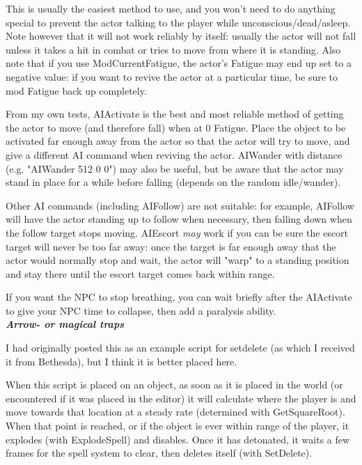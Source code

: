 This is usually the easiest method to use, and you won't need to do
anything special to prevent the actor talking to the player while
unconscious/dead/asleep. Note however that it will not work reliably by
itself: usually the actor will not fall unless it takes a hit in combat
or tries to move from where it is standing. Also note that if you use
ModCurrentFatigue, the actor's Fatigue may end up set to a negative
value: if you want to revive the actor at a particular time, be sure to
mod Fatigue back up completely.

From my own tests, AIActivate is the best and most reliable method of
getting the actor to move (and therefore fall) when at 0 Fatigue. Place
the object to be activated far enough away from the actor so that the
actor will try to move, and give a different AI command when reviving
the actor. AIWander with distance (e.g. "AIWander 512 0 0") may also be
useful, but be aware that the actor may stand in place for a while
before falling (depends on the random idle/wander).

Other AI commands (including AIFollow) are not suitable: for example,
AIFollow will have the actor standing up to follow when necessary, then
falling down when the follow target stops moving. AIEscort \emph{may}
work if you can be sure the escort target will never be too far away:
once the target is far enough away that the actor would normally stop
and wait, the actor will "warp" to a standing position and stay there
until the escort target comes back within range.

If you want the NPC to stop breathing, you can wait briefly after the
AIActivate to give your NPC time to collapse, then add a paralysis
ability.\\
\emph{\textbf{Arrow- or magical traps}}

I had originally posted this as an example script for setdelete (as
which I received it from Bethesda), but I think it is better placed
here.

When this script is placed on an object, as soon as it is placed in the
world (or encountered if it was placed in the editor) it will calculate
where the player is and move towards that location at a steady rate
(determined with GetSquareRoot). When that point is reached, or if the
object is ever within range of the player, it explodes (with
ExplodeSpell) and disables. Once it has detonated, it waits a few frames
for the spell system to clear, then deletes itself (with SetDelete).



